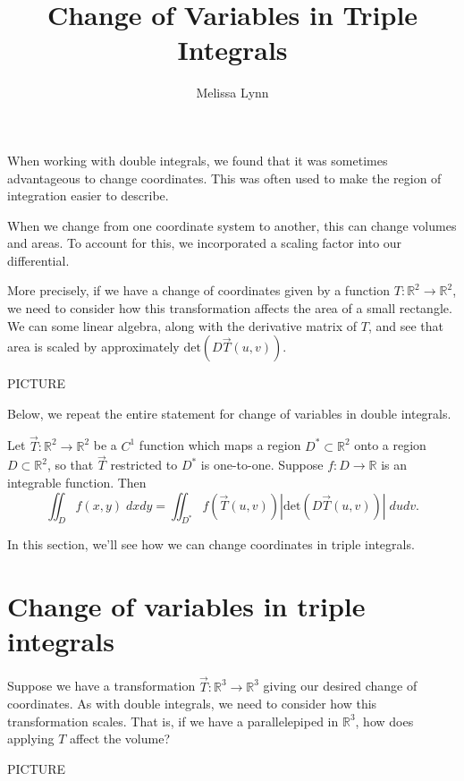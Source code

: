 \documentclass{ximera}
\title{Change of Variables in Triple Integrals}
\author{Melissa Lynn}
\begin{document}
  
\begin{abstract}  
\end{abstract}  
\maketitle 

When working with double integrals, we found that it was sometimes advantageous to change coordinates. This was often used to make the region of integration easier to describe.

When we change from one coordinate system to another, this can change volumes and areas. To account for this, we incorporated a scaling factor into our differential.

More precisely, if we have a change of coordinates given by a function $T:\mathbb{R}^2\rightarrow\mathbb{R}^2$, we need to consider how this transformation affects the area of a small rectangle. We can some linear algebra, along with the derivative matrix of $T$, and see that area is scaled by approximately $\text{det}(D\vec{T}(u,v))$.

PICTURE

Below, we repeat the entire statement for change of variables in double integrals.

\begin{proposition}
Let $\vec{T}:\mathbb{R}^2\rightarrow\mathbb{R}^2$ be a $C^1$ function which maps a region $D^*\subset\mathbb{R}^2$ onto a region $D\subset\mathbb{R}^2$, so that $\vec{T}$ restricted to $D^*$ is one-to-one. Suppose $f:D\rightarrow\mathbb{R}$ is an integrable function. Then
\[
\iint_D f(x,y)\;dxdy = \iint_{D^*} f(\vec{T}(u,v))\left|\text{det}(D\vec{T}(u,v))\right|\;dudv.
\]
\end{proposition} 

In this section, we'll see how we can change coordinates in triple integrals.

\section*{Change of variables in triple integrals}

Suppose we have a transformation $\vec{T}:\mathbb{R}^3\rightarrow\mathbb{R}^3$ giving our desired change of coordinates. As with double integrals, we need to consider how this transformation scales. That is, if we have a parallelepiped in $\mathbb{R}^3$, how does applying $T$ affect the volume?

PICTURE
\end{document}
